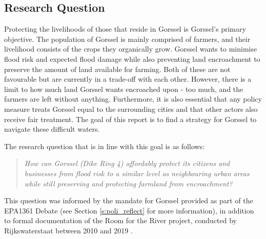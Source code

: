 


\subsection{Research Question}

Protecting the livelihoods of those that reside in Gorssel is Gorssel's primary objective. The population of Gorssel is mainly comprised of farmers, and their livelihood consists of the crops they organically grow. Gorssel wants to minimise flood risk and expected flood damage while also preventing land encroachment to preserve the amount of land available for farming. Both of these are not favourable but are currently in a trade-off with each other. However, there is a limit to how much land Gorssel wants encroached upon - too much, and the farmers are left without anything. Furthermore, it is also essential that any policy measure treats Gorssel equal to the surrounding cities and that other actors also receive fair treatment. The goal of this report is to find a strategy for Gorssel to navigate these difficult waters. %


The research question that is in line with this goal is as follows: 
\begin{quote}
    \textit{How can Gorssel (Dike Ring 4) affordably protect its citizens and businesses from flood risk to a similar level as neighbouring urban areas while still preserving and protecting farmland from encroachment?}
\end{quote}

This question was informed by the mandate for Gorssel provided as part of the EPA1361 Debate (see Section \ref{s:poli_reflect} for more information), in addition to formal documentation of the Room for the River project, conducted by Rijkswaterstaat between 2010 and 2019 \parencite{rijkswaterstaat_tailor_2013,rijke_room_2012}.

